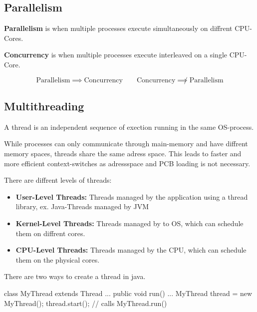 \subsection{Parallelism}

\begin{definition}
\textbf{Parallelism } is when multiple processes execute simultaneously on diffrent CPU-Cores.
\end{definition}

\begin{definition}
\textbf{Concurrency } is when multiple processes execute interleaved on a single CPU-Core.
\end{definition}

\begin{remark}
$$\text{Parallelism} \implies \text{Concurrency} \quad\quad \text{Concurrency} \not\implies \text{Parallelism}$$
\end{remark}

\subsection{Multithreading}

\begin{definition}
A thread is an independent sequence of exection running in the same OS-process.     
\end{definition}

\begin{remark}
While processes can only communicate through main-memory and have diffrent memory spaces, threads share
the same adress space. This leads to faster and more efficient context-switches as adressspace and PCB loading is not necessary.
\end{remark}

There are diffrent levels of threads:
\begin{itemize}
    \item \textbf{User-Level Threads: } Threads managed by the application using a thread library, ex. Java-Threads managed by JVM
    \item \textbf{Kernel-Level Threads: }Threads managed by to OS, which can schedule them on diffrent cores.
    \item \textbf{CPU-Level Threads:} Threads managed by the CPU, which can schedule them on the physical cores.
\end{itemize}

There are two ways to create a thread in java.

\begin{codeexample}
class MyThread extends Thread { ...
    public void run() {
        ...
    }
}
MyThread thread = new MyThread();
thread.start(); // calls MyThread.run()
\end{codeexample}

